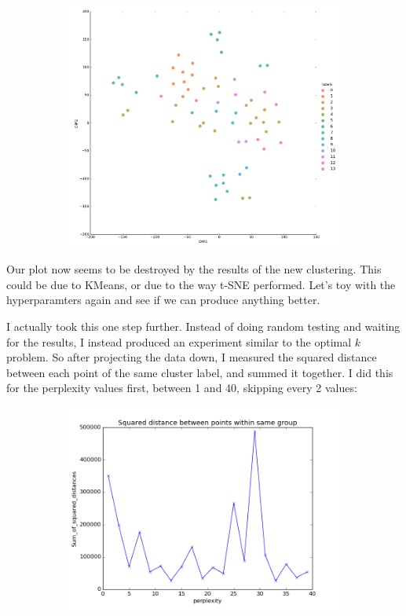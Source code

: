 \documentclass[20pt]{article} %
\begin{document}
\newpage
\begin{figure}[!htbp]
  	\centering
   	\begin{subfigure}[p]{0.7\linewidth}
    	\includegraphics[width=\linewidth]{./figures/plot5.png}
   	\end{subfigure}
\end{figure}
Our plot now seems to be destroyed by the results of the new clustering.  This could be due to KMeans, or due to the way t-SNE performed.  Let's toy with the hyperparamters again and see if we can produce anything better.

I actually took this one step further.  Instead of doing random testing and waiting for the results, I instead produced an experiment similar to the optimal $k$ problem.  So after projecting the data down, I measured the squared distance between each point of the same cluster label, and summed it together. I did this for the perplexity values first, between 1 and 40, skipping every 2 values:
\begin{figure}[!htbp]
  	\centering
   	\begin{subfigure}[p]{0.6\linewidth}
    	\includegraphics[width=\linewidth]{./figures/optimal_perp.png}
   	\end{subfigure}
\end{figure}
\end{document}
